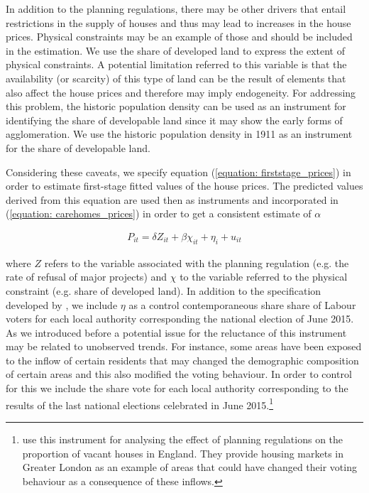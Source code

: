 \documentclass[12pt,letterpaper]{article}
\begin{document}
In addition to the planning regulations, there may be other drivers that entail 
restrictions in the supply of houses and thus may lead to increases in the house 
prices. Physical constraints may be an example of those and should be included in the 
estimation. We use the share of developed land to express the extent of physical 
constraints. A potential limitation referred to this variable is that 
  the availability (or scarcity) of this type of land can be the result of elements that 
  also affect the house prices and therefore may imply endogeneity. For 
  addressing this problem, the historic population density can be used as an 
  instrument for identifying the share of developable land since it may show the 
  early forms of agglomeration. We use the historic population density in 1911 
  as an instrument for the share of developable land. 
  
Considering these caveats, we specify equation (\ref{equation: firststage_prices}) in order to estimate first-stage fitted values of the
 house prices. The predicted values derived from this equation are used then as instruments and incorporated in
 (\ref{equation: carehomes_prices}) in order to get a consistent estimate of $\alpha$

  \begin{eqnarray}
\label{equation: firststage_prices}
    P_{it} = \delta Z_{it} + \beta \chi_{it} + \eta_{i} + u_{it} 
 \end{eqnarray}

 where $Z$ refers to the variable associated with the planning regulation (e.g. the rate of refusal of major projects) and $\chi$  
 to the variable referred to the physical constraint (e.g. share of developed land). In addition to the specification developed by 
\cite{hilber2016supply}, we include $\eta$ as a control contemporaneous share 
share of Labour voters for each local authority corresponding the national election of June 
2015.  As we introduced before a potential issue for the reluctance of this instrument may be related to 
unobserved trends. For instance, some areas have been exposed to the inflow of
certain residents that may changed the demographic composition of certain areas and this also modified the voting behaviour. In order to 
control for this we include the share vote for each local authority 
corresponding to the results of the last national elections celebrated in June 
2015.\footnote{ \citet{cheshire2016} use this instrument for analysing the effect of planning regulations on the 
proportion of vacant houses in England. They provide housing markets in Greater London as an example of areas
that could have changed  their voting behaviour as a consequence of these inflows.}
\end{document}
